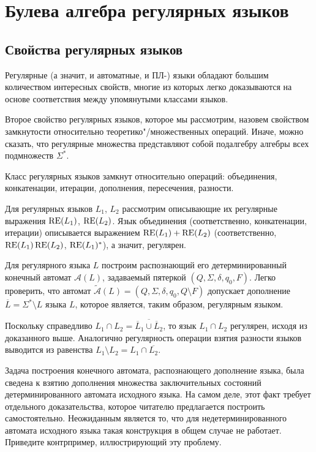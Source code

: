 \chapter{Булева алгебра регулярных языков}
\label{Chapter5}

\section{Свойства регулярных языков}
\label{Chapter5PropsReg}

Регулярные (а значит, и автоматные, и ПЛ-) языки обладают большим 
количеством интересных свойств, многие из которых легко доказываются на 
основе соответствия между упомянутыми классами языков.

Второе свойство регулярных языков, которое мы рассмотрим, назовем 
свойством замкнутости относительно теоретико"/множественных операций. 
Иначе, можно сказать, что регулярные множества представляют собой 
подалгебру алгебры всех подмножеств $\Sigma^*$.

\begin{mytheorem} Класс регулярных языков замкнут относительно 
операций: объединения, конкатенации, итерации, дополнения, пересечения, 
разности. \end{mytheorem}

\begin{myproof}Для регулярных языков $L_1$, $L_2$ рассмотрим описывающие
их регулярные выражения $\operatorname{RE}(L_1)$, $\operatorname{RE}(L_2)$. Язык объединения
(соответственно, конкатенации, итерации) описывается выражением $\operatorname{RE}(L_1) +
\operatorname{RE}(L_2)$ (соответственно, $\operatorname{RE}(L_1)\operatorname{RE}(L_2)$, $\operatorname{RE}(L_1)^\ast$), а значит,
регулярен.

Для регулярного языка $L$ построим распознающий его
детерминированный конечный автомат $\mathcal A(L)$, задаваемый пятеркой $(Q, \Sigma, \delta, q_0, F)$. Легко
проверить, что автомат $\widetilde{\mathcal A}(L) = (Q, \Sigma, \delta, q_0, Q
\setminus F)$ допускает дополнение $\overline L = \Sigma^\ast \setminus L$ языка
$L$, которое является, таким образом, регулярным языком.

Поскольку справедливо $L_1 \cap L_2 = \overline{\overline L_1 \cup \overline
L_2}$, то язык $L_1 \cap L_2$ регулярен, исходя из доказанного выше.
Аналогично регулярность операции взятия разности языков выводится из
равенства $L_1 \setminus L_2 = L_1 \cap \overline{L_2}$.
\end{myproof}

\begin{myproblem}
Задача построения конечного автомата, распознающего дополнение
языка, была сведена к взятию дополнения множества заключительных
состояний детерминированного автомата исходного языка. На самом деле, этот факт
требует отдельного доказательства, которое читателю предлагается
построить самостоятельно. Неожиданным является то, что для
недетерминированного автомата исходного языка
такая конструкция в общем случае не
работает. Приведите контрпример, иллюстрирующий эту проблему.
\end{myproblem}

